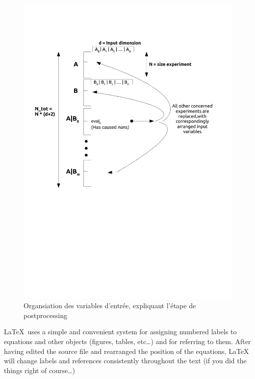 \documentclass[a4paper,10pt]{article}
\begin{document}
\begin{figure}[H]
   \centering   
   \includegraphics[scale=0.45]{schema_postprocessing.pdf}
      \caption{Organsiation des variables d'entrée, expliquant l'étape de postprocessing}
         \label{posprocessing}
\end{figure}





\LaTeX\, uses a simple and convenient system for assigning numbered labels
to equations and other objects (figures, tables, etc\ldots) and for referring
to them. After having edited the source file and rearranged the position of
the equations, \LaTeX\, will  change labels and references
consistently throughout the text (if you did the things right of
course\ldots) 
 
\end{document}
